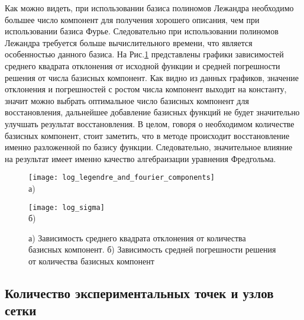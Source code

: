 Как можно видеть, при использовании базиса полиномов Лежандра необходимо большее число компонент для получения хорошего описания, чем при использовании базиса Фурье. Следовательно при использовании полиномов Лежандра требуется больше вычислительного времени, что является особенностью данного базиса. На Рис.\ref{pic:graf1} представлены графики зависимостей среднего квадрата отклонения от исходной функции и средней погрешности решения от числа базисных компонент. Как видно из данных графиков, значение отклонения и погрешностей с ростом числа компонент выходит на константу, значит можно выбрать оптимальное число базисных компонент для восстановления, дальнейшее добавление базисных функций не будет значительно улучшать результат восстановления.
В целом, говоря о необходимом количестве базисных компонент, стоит заметить, что в методе происходит восстановление именно разложенной по базису функции. Следовательно, значительное влияние на результат имеет именно качество алгебраизации уравнения Фредгольма. 
\begin{comment}
\begin{figure}[h! ]
	\label{pic:7}
	\center{\texttt{[image: legendre\_and\_fourier\_components]}}
	\caption{График для разных значений m для лежандров и фурье.}
\end{figure}
\end{comment}

\begin{figure}[h! ]
\begin{center}
\begin{minipage}[h]{0.48\linewidth}
	\texttt{[image: log\_legendre\_and\_fourier\_components]} \\а)
\end{minipage}
	\hfill
\begin{minipage}[h]{0.48\linewidth}
\texttt{[image: log\_sigma]} \\б)
\end{minipage}
	\caption{а) Зависимость среднего квадрата отклонения от количества базисных компонент. б) Зависимость средней погрешности решения от количества базисных компонент}
\label{pic:graf1}
\end{center}
\end{figure}


\subsection{Количество экспериментальных точек и узлов сетки}

